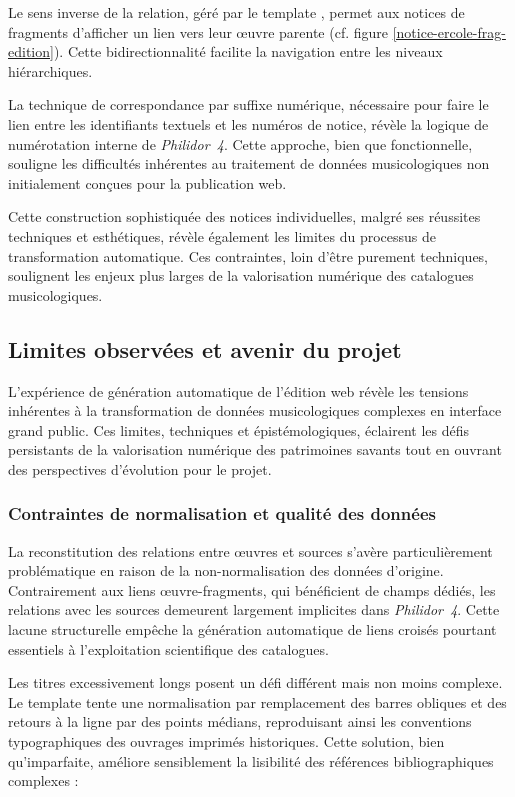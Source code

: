Le sens inverse de la relation, géré par le template , permet aux notices de fragments d'afficher un lien vers leur œuvre parente (cf. figure \ref{notice-ercole-frag-edition}). Cette bidirectionnalité facilite la navigation entre les niveaux hiérarchiques.

La technique de correspondance par suffixe numérique, nécessaire pour faire le lien entre les identifiants textuels et les numéros de notice, révèle la logique de numérotation interne de \textit{Philidor~4}. Cette approche, bien que fonctionnelle, souligne les difficultés inhérentes au traitement de données musicologiques non initialement conçues pour la publication web.

Cette construction sophistiquée des notices individuelles, malgré ses réussites techniques et esthétiques, révèle également les limites du processus de transformation automatique. Ces contraintes, loin d'être purement techniques, soulignent les enjeux plus larges de la valorisation numérique des catalogues musicologiques.

\subsection{Limites observées et avenir du projet}

L'expérience de génération automatique de l'édition web révèle les tensions inhérentes à la transformation de données musicologiques complexes en interface grand public. Ces limites, techniques et épistémologiques, éclairent les défis persistants de la valorisation numérique des patrimoines savants tout en ouvrant des perspectives d'évolution pour le projet.

\subsubsection{Contraintes de normalisation et qualité des données}

La reconstitution des relations entre œuvres et sources s'avère particulièrement problématique en raison de la non-normalisation des données d'origine. Contrairement aux liens œuvre-fragments, qui bénéficient de champs dédiés, les relations avec les sources demeurent largement implicites dans \textit{Philidor~4}. Cette lacune structurelle empêche la génération automatique de liens croisés pourtant essentiels à l'exploitation scientifique des catalogues.

Les titres excessivement longs posent un défi différent mais non moins complexe. Le template  tente une normalisation par remplacement des barres obliques et des retours à la ligne par des points médians, reproduisant ainsi les conventions typographiques des ouvrages imprimés historiques. Cette solution, bien qu'imparfaite, améliore sensiblement la lisibilité des références bibliographiques complexes :

